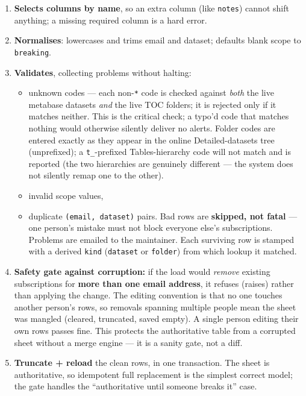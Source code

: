 \documentclass[
]{article}
\providecommand{\tightlist}{%
  \setlength{\itemsep}{0pt}\setlength{\parskip}{0pt}}
\begin{document}
\begin{enumerate}
\def\labelenumi{\arabic{enumi}.}
\tightlist
\item
  \textbf{Selects columns by name}, so an extra column (like
  \texttt{notes}) cannot shift anything; a missing required column is a
  hard error.
\item
  \textbf{Normalises}: lowercases and trims email and dataset; defaults
  blank scope to \texttt{breaking}.
\item
  \textbf{Validates}, collecting problems without halting:

  \begin{itemize}
  \tightlist
  \item
    unknown codes --- each non-\texttt{*} code is checked against
    \emph{both} the live metabase datasets \emph{and} the live TOC
    folders; it is rejected only if it matches neither. This is the
    critical check; a typo'd code that matches nothing would otherwise
    silently deliver no alerts. Folder codes are entered exactly as they
    appear in the online Detailed-datasets tree (unprefixed); a
    \texttt{t\_}-prefixed Tables-hierarchy code will not match and is
    reported (the two hierarchies are genuinely different --- the system
    does not silently remap one to the other).
  \item
    invalid scope values,
  \item
    duplicate \texttt{(email,\ dataset)} pairs. Bad rows are
    \textbf{skipped, not fatal} --- one person's mistake must not block
    everyone else's subscriptions. Problems are emailed to the
    maintainer. Each surviving row is stamped with a derived
    \texttt{kind} (\texttt{dataset} or \texttt{folder}) from which
    lookup it matched.
  \end{itemize}
\item
  \textbf{Safety gate against corruption:} if the load would
  \emph{remove} existing subscriptions for \textbf{more than one email
  address}, it refuses (raises) rather than applying the change. The
  editing convention is that no one touches another person's rows, so
  removals spanning multiple people mean the sheet was mangled (cleared,
  truncated, saved empty). A single person editing their own rows passes
  fine. This protects the authoritative table from a corrupted sheet
  without a merge engine --- it is a sanity gate, not a diff.
\item
  \textbf{Truncate + reload} the clean rows, in one transaction. The
  sheet is authoritative, so idempotent full replacement is the simplest
  correct model; the gate handles the ``authoritative until someone
  breaks it'' case.
\end{enumerate}
\end{document}
